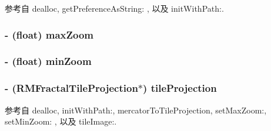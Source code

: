 参考自 dealloc, get\-Preference\-As\-String\-: , 以及 init\-With\-Path\-:.

\hypertarget{interface_r_m_d_b_map_source_ad86d4d2b0eed882420b870bcb842233e}{
\subsubsection[{max\-Zoom}]{\setlength{\rightskip}{0pt plus 5cm}-\/ (float) max\-Zoom\hspace{0.3cm}{\ttfamily [protected]}}}\label{interface_r_m_d_b_map_source_ad86d4d2b0eed882420b870bcb842233e}
\hypertarget{interface_r_m_d_b_map_source_a7f12d75beb479fbc8b50f2a8cf64a14b}{
\subsubsection[{min\-Zoom}]{\setlength{\rightskip}{0pt plus 5cm}-\/ (float) min\-Zoom\hspace{0.3cm}{\ttfamily [protected]}}}\label{interface_r_m_d_b_map_source_a7f12d75beb479fbc8b50f2a8cf64a14b}
\hypertarget{interface_r_m_d_b_map_source_a98ff222a2a972bf6cf4c317f4d7fa5dc}{
\subsubsection[{tile\-Projection}]{\setlength{\rightskip}{0pt plus 5cm}-\/ ({\bf R\-M\-Fractal\-Tile\-Projection}$\ast$) tile\-Projection\hspace{0.3cm}{\ttfamily [protected]}}}\label{interface_r_m_d_b_map_source_a98ff222a2a972bf6cf4c317f4d7fa5dc}


参考自 dealloc, init\-With\-Path\-:, mercator\-To\-Tile\-Projection, set\-Max\-Zoom\-:, set\-Min\-Zoom\-: , 以及 tile\-Image\-:.

